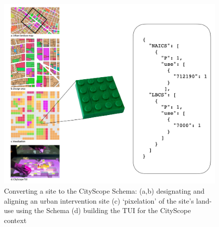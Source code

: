 {{      \begin{figure}[!htb]
          \begin{center}
              \includegraphics[width=.65\textwidth]{chapters/transformation/cs_arch/figures/arch/cs_arch3.png}
          \end{center}
          \caption{Converting a site to the CityScope Schema: (a,b) designating and aligning an urban intervention site (c) `pixelation' of the site's land-use using the Schema (d) building the TUI for the CityScope context}
          \label{fig:voxel_to_schema}
      \end{figure}


}}
